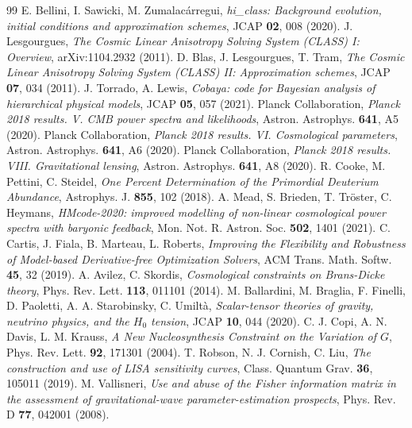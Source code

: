 \documentclass[11pt,a4paper]{article}
\begin{document}
\begin{thebibliography}{99}
 E. Bellini, I. Sawicki, M. Zumalacárregui, \textit{hi\_class: Background evolution, initial conditions and approximation schemes}, JCAP \textbf{02}, 008 (2020).
 J. Lesgourgues, \textit{The Cosmic Linear Anisotropy Solving System (CLASS) I: Overview}, arXiv:1104.2932 (2011).
 D. Blas, J. Lesgourgues, T. Tram, \textit{The Cosmic Linear Anisotropy Solving System (CLASS) II: Approximation schemes}, JCAP \textbf{07}, 034 (2011).
 J. Torrado, A. Lewis, \textit{Cobaya: code for Bayesian analysis of hierarchical physical models}, JCAP \textbf{05}, 057 (2021).
 Planck Collaboration, \textit{Planck 2018 results. V. CMB power spectra and likelihoods}, Astron. Astrophys. \textbf{641}, A5 (2020).
 Planck Collaboration, \textit{Planck 2018 results. VI. Cosmological parameters}, Astron. Astrophys. \textbf{641}, A6 (2020).
 Planck Collaboration, \textit{Planck 2018 results. VIII. Gravitational lensing}, Astron. Astrophys. \textbf{641}, A8 (2020).
 R. Cooke, M. Pettini, C. Steidel, \textit{One Percent Determination of the Primordial Deuterium Abundance}, Astrophys. J. \textbf{855}, 102 (2018).
 A. Mead, S. Brieden, T. Tröster, C. Heymans, \textit{HMcode-2020: improved modelling of non-linear cosmological power spectra with baryonic feedback}, Mon. Not. R. Astron. Soc. \textbf{502}, 1401 (2021).
 C. Cartis, J. Fiala, B. Marteau, L. Roberts, \textit{Improving the Flexibility and Robustness of Model-based Derivative-free Optimization Solvers}, ACM Trans. Math. Softw. \textbf{45}, 32 (2019).
 A. Avilez, C. Skordis, \textit{Cosmological constraints on Brans-Dicke theory}, Phys. Rev. Lett. \textbf{113}, 011101 (2014).
 M. Ballardini, M. Braglia, F. Finelli, D. Paoletti, A. A. Starobinsky, C. Umiltà, \textit{Scalar-tensor theories of gravity, neutrino physics, and the $H_0$ tension}, JCAP \textbf{10}, 044 (2020).
 C. J. Copi, A. N. Davis, L. M. Krauss, \textit{A New Nucleosynthesis Constraint on the Variation of $G$}, Phys. Rev. Lett. \textbf{92}, 171301 (2004).
 T. Robson, N. J. Cornish, C. Liu, \textit{The construction and use of LISA sensitivity curves}, Class. Quantum Grav. \textbf{36}, 105011 (2019).
 M. Vallisneri, \textit{Use and abuse of the Fisher information matrix in the assessment of gravitational-wave parameter-estimation prospects}, Phys. Rev. D \textbf{77}, 042001 (2008).

\end{thebibliography}
\end{document}
